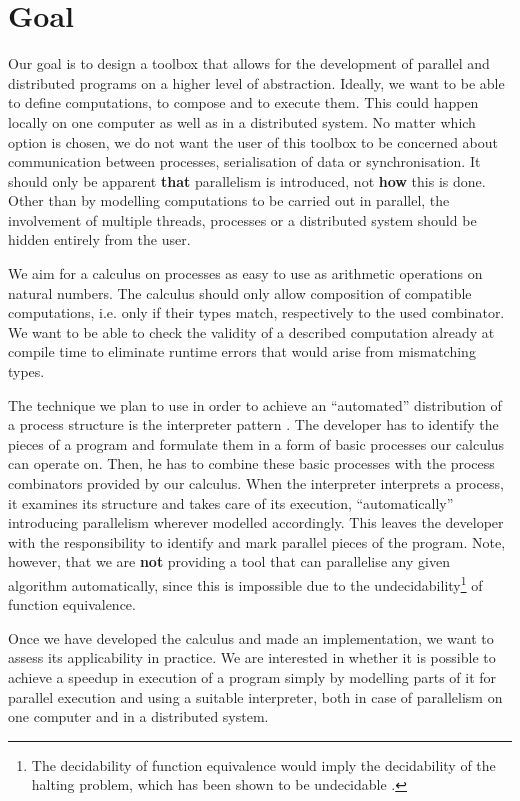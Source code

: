 \section{Goal}
\label{chp:goal}
Our goal is to design a toolbox that allows for the development of parallel and distributed programs on a higher level of abstraction. Ideally, we want to be able to define computations, to compose and to execute them. This could happen locally on one computer as well as in a distributed system. No matter which option is chosen, we do not want the user of this toolbox to be concerned about communication between processes, serialisation of data or synchronisation. It should only be apparent \textbf{that} parallelism is introduced, not \textbf{how} this is done. Other than by modelling computations to be carried out in parallel, the involvement of multiple threads, processes or a distributed system should be hidden entirely from the user.

We aim for a calculus on processes as easy to use as arithmetic operations on natural numbers. The calculus should only allow composition of compatible computations, i.e. only if their types match, respectively to the used combinator. We want to be able to check the validity of a described computation already at compile time to eliminate runtime errors that would arise from mismatching types.

The technique we plan to use in order to achieve an \enquote{automated} distribution of a process structure is the interpreter pattern \cite{Gamma:1995:DPE:186897}. The developer has to identify the pieces of a program and formulate them in a form of basic processes our calculus can operate on. Then, he has to combine these basic processes with the process combinators provided by our calculus. When the interpreter interprets a process, it examines its structure and takes care of its execution, \enquote{automatically} introducing parallelism wherever modelled accordingly. This leaves the developer with the responsibility to identify and mark parallel pieces of the program. Note, however, that we are \textbf{not} providing a tool that can parallelise any given algorithm automatically, since this is impossible due to the undecidability\footnote{The decidability of function equivalence would imply the decidability of the halting problem, which has been shown to be undecidable \citep{Garey:1979:CIG:578533}.} of function equivalence.

Once we have developed the calculus and made an implementation, we want to assess its applicability in practice. We are interested in whether it is possible to achieve a speedup in execution of a program simply by modelling parts of it for parallel execution and using a suitable interpreter, both in case of parallelism on one computer and in a distributed system.

